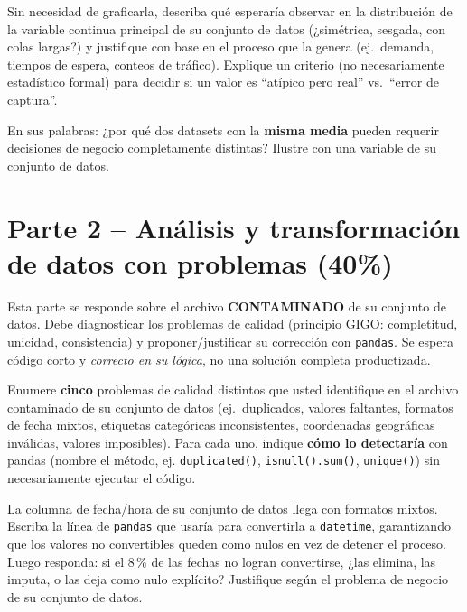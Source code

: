 \documentclass[11pt]{article}
\begin{document}
\begin{pregunta}
Sin necesidad de graficarla, describa qué esperaría observar en la distribución de la variable continua principal de su conjunto de datos (¿simétrica, sesgada, con colas largas?) y justifique con base en el proceso que la genera (ej.\ demanda, tiempos de espera, conteos de tráfico). Explique un criterio (no necesariamente estadístico formal) para decidir si un valor es ``atípico pero real'' vs.\ ``error de captura''.
\end{pregunta}

\begin{pregunta}
En sus palabras: ¿por qué dos datasets con la \textbf{misma media} pueden requerir decisiones de negocio completamente distintas? Ilustre con una variable de su conjunto de datos.
\end{pregunta}

\section{Parte 2 -- Análisis y transformación de datos con problemas (40\%)}
\begin{contexto}
Esta parte se responde sobre el archivo \textbf{CONTAMINADO} de su conjunto de datos. Debe diagnosticar los problemas de calidad (principio GIGO: completitud, unicidad, consistencia) y proponer/justificar su corrección con \texttt{pandas}. Se espera código corto y \emph{correcto en su lógica}, no una solución completa productizada.
\end{contexto}

\begin{pregunta}
Enumere \textbf{cinco} problemas de calidad distintos que usted identifique en el archivo contaminado de su conjunto de datos (ej.\ duplicados, valores faltantes, formatos de fecha mixtos, etiquetas categóricas inconsistentes, coordenadas geográficas inválidas, valores imposibles). Para cada uno, indique \textbf{cómo lo detectaría} con pandas (nombre el método, ej. \texttt{duplicated()}, \texttt{isnull().sum()}, \texttt{unique()}) sin necesariamente ejecutar el código.
\end{pregunta}

\begin{pregunta}
La columna de fecha/hora de su conjunto de datos llega con formatos mixtos. Escriba la línea de \texttt{pandas} que usaría para convertirla a \texttt{datetime}, garantizando que los valores no convertibles queden como nulos en vez de detener el proceso. Luego responda: si el 8\,\% de las fechas no logran convertirse, ¿las elimina, las imputa, o las deja como nulo explícito? Justifique según el problema de negocio de su conjunto de datos.
\end{pregunta}
\end{document}
